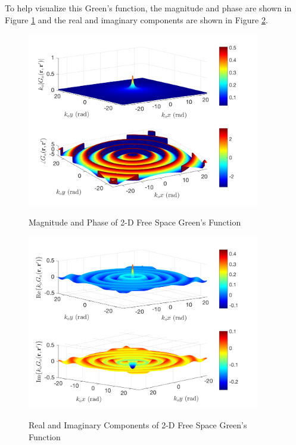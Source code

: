 To help visualize this Green's function, the magnitude and phase are shown in Figure \ref{gf_fig:3} and the real and imaginary components are shown in Figure \ref{gf_fig:4}.

\begin{figure}[ht]
\centering
\includegraphics[width=4in]{../media/2d_fs_gf_mag.png}
\renewcommand{\baselinestretch}{1}
\small\normalsize
\begin{quote}
\caption[Magnitude and Phase of 2-D Free Space Green's Function]{Magnitude and Phase of 2-D Free Space Green's Function \label{gf_fig:3}}
\end{quote}
\end{figure} 
\renewcommand{\baselinestretch}{2}
\small\normalsize

\begin{figure}[ht]
\centering
\includegraphics[width=4in]{../media/2d_fs_gf_re_im.png}
\renewcommand{\baselinestretch}{1}
\small\normalsize
\begin{quote}
\caption[Real and Imaginary Components of 2-D Free Space Green's Function]{Real and Imaginary Components of 2-D Free Space Green's Function \label{gf_fig:4}}
\end{quote}
\end{figure} 
\renewcommand{\baselinestretch}{2}
\small\normalsize

